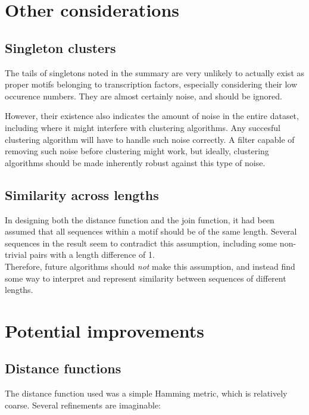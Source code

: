 \documentclass[fleqn]{book}
\begin{document}
\section{Other considerations}\label{other-considerations}

\subsection{Singleton clusters}\label{singleton-clusters}

The tails of singletons noted in the summary are very unlikely to
actually exist as proper motifs belonging to transcription factors,
especially considering their low occurence numbers. They are almost
certainly noise, and should be ignored.

However, their existence also indicates the amount of noise in the
entire dataset, including where it might interfere with clustering
algorithms. Any succesful clustering algorithm will have to handle such
noise correctly. A filter capable of removing such noise before
clustering might work, but ideally, clustering algorithms should be made
inherently robust against this type of noise.

\subsection{Similarity across lengths}\label{similarity-across-lengths}

In designing both the distance function and the join function, it had
been assumed that all sequences within a motif should be of the same
length. Several sequences in the result seem to contradict this
assumption, including some non-trivial pairs with a length difference of
1.\\
Therefore, future algorithms should \emph{not} make this assumption, and
instead find some way to interpret and represent similarity between
sequences of different lengths.

\section{Potential improvements}\label{potential-improvements}

\subsection{Distance functions}\label{distance-functions}

The distance function used was a simple Hamming metric, which is
relatively coarse. Several refinements are imaginable:
\end{document}
